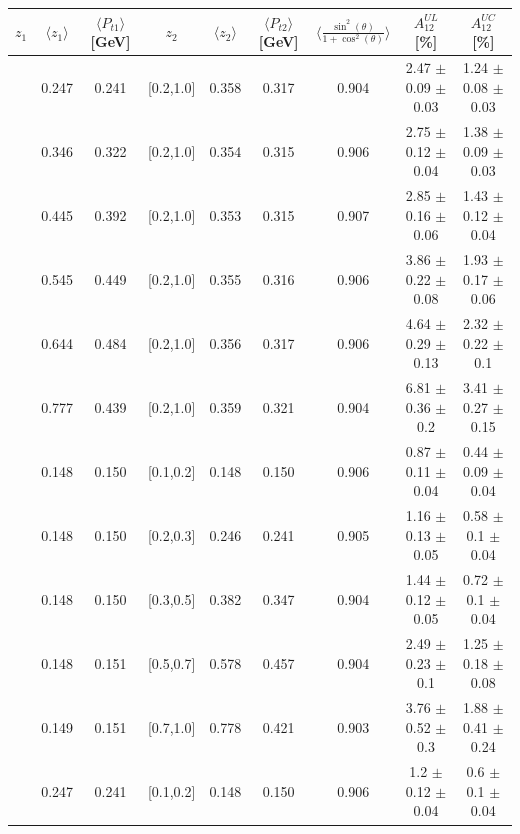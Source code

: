 \begin{table}[H]\tiny
\centering
\begin{tabular}{|c|c|c|c|c|c|c|c|c|}
\hline
$z_1$ & $\langle  z_1 \rangle$ & $\langle  P_{t1}  \rangle$ [GeV] & $z_2$ &  $\langle  z_2 \rangle$ & $\langle  P_{t2}\rangle$  [GeV] &$\langle\frac{\sin^2(\theta)}{1+\cos^2(\theta)}\rangle$ & $A_{12}^{UL}$ [\%] &  $A_{12}^{UC}$ [\%]   \\ \hline
[0.2,0.3]	&	0.247	&	0.241	&	[0.2,1.0]	&	0.358	&	0.317	&	0.904	&2.47  $\pm$ 0.09  $\pm$ 0.03 &1.24  $\pm$ 0.08  $\pm$ 0.03 \\ \hline
[0.3,0.4]	&	0.346	&	0.322	&	[0.2,1.0]	&	0.354	&	0.315	&	0.906	&2.75  $\pm$ 0.12  $\pm$ 0.04 &1.38  $\pm$ 0.09  $\pm$ 0.03 \\ \hline
[0.4,0.5]	&	0.445	&	0.392	&	[0.2,1.0]	&	0.353	&	0.315	&	0.907	&2.85  $\pm$ 0.16  $\pm$ 0.06 &1.43  $\pm$ 0.12  $\pm$ 0.04 \\ \hline
[0.5,0.6]	&	0.545	&	0.449	&	[0.2,1.0]	&	0.355	&	0.316	&	0.906	&3.86  $\pm$ 0.22  $\pm$ 0.08 &1.93  $\pm$ 0.17  $\pm$ 0.06 \\ \hline
[0.6,0.7]	&	0.644	&	0.484	&	[0.2,1.0]	&	0.356	&	0.317	&	0.906	&4.64  $\pm$ 0.29  $\pm$ 0.13 &2.32  $\pm$ 0.22  $\pm$ 0.1  \\ \hline
[0.7,1.0]	&	0.777	&	0.439	&	[0.2,1.0]	&	0.359	&	0.321	&	0.904	&6.81  $\pm$ 0.36  $\pm$ 0.2  &3.41  $\pm$ 0.27  $\pm$ 0.15 \\ \hline
\hline
[0.1,0.2]	&	0.148	&	0.150	&	[0.1,0.2]	&	0.148	&	0.150	&	0.906	&0.87  $\pm$ 0.11  $\pm$ 0.04   &	0.44  $\pm$ 0.09  $\pm$ 0.04  \\ \hline
[0.1,0.2]	&	0.148	&	0.150	&	[0.2,0.3]	&	0.246	&	0.241	&	0.905	&1.16  $\pm$ 0.13  $\pm$ 0.05   &	0.58  $\pm$ 0.1  $\pm$ 0.04   \\ \hline
[0.1,0.2]	&	0.148	&	0.150	&	[0.3,0.5]	&	0.382	&	0.347	&	0.904	&1.44  $\pm$ 0.12  $\pm$ 0.05   &	0.72  $\pm$ 0.1  $\pm$ 0.04   \\ \hline
[0.1,0.2]	&	0.148	&	0.151	&	[0.5,0.7]	&	0.578	&	0.457	&	0.904	&2.49  $\pm$ 0.23  $\pm$ 0.1    &	1.25  $\pm$ 0.18  $\pm$ 0.08  \\ \hline
[0.1,0.2]	&	0.149	&	0.151	&	[0.7,1.0]	&	0.778	&	0.421	&	0.903	&3.76  $\pm$ 0.52  $\pm$ 0.3    &	1.88  $\pm$ 0.41  $\pm$ 0.24  \\ \hline
\hline
[0.2,0.3]	&	0.247	&	0.241	&	[0.1,0.2]	&	0.148	&	0.150	&	0.906	&1.2  $\pm$ 0.12  $\pm$ 0.04    &	0.6  $\pm$ 0.1  $\pm$ 0.04    \\ \hline

\end{tabular}
\end{table}
